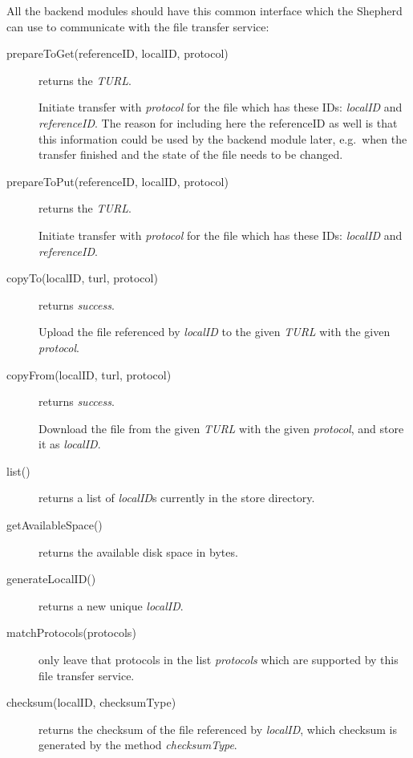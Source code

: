 \documentclass{book}
\begin{document}
All the backend modules should have this common interface which the Shepherd can use to communicate with the file transfer service:
\begin{description}
    \item[prepareToGet(referenceID, localID, protocol)] returns the \emph{TURL}.
    
    Initiate transfer with \emph{protocol} for the file which has these IDs: \emph{localID} and \emph{referenceID}. The reason for including here the referenceID as well is that this information could be used by the backend module later, e.g.~when the transfer finished and the state of the file needs to be changed.
    
    \item[prepareToPut(referenceID, localID, protocol)] returns the \emph{TURL}.
    
    Initiate transfer with \emph{protocol} for the file which has these IDs: \emph{localID} and \emph{referenceID}.
    
    \item[copyTo(localID, turl, protocol)] returns \emph{success}.
    
    Upload the file referenced by \emph{localID} to the given \emph{TURL} with the given \emph{protocol}.
    
    \item[copyFrom(localID, turl, protocol)] returns \emph{success}.
    
    Download the file from the given \emph{TURL} with the given \emph{protocol}, and store it as \emph{localID}.
    
    \item[list()] returns a list of \emph{localID}s currently in the store directory.
    \item[getAvailableSpace()] returns the available disk space in bytes.
    \item[generateLocalID()] returns a new unique \emph{localID}.
    \item[matchProtocols(protocols)] only leave that protocols in the list \emph{protocols} which are supported by this file transfer service.
    \item[checksum(localID, checksumType)] returns the checksum of the file referenced by \emph{localID}, which checksum is generated by the method \emph{checksumType}.
     
\end{description}

\end{document}
